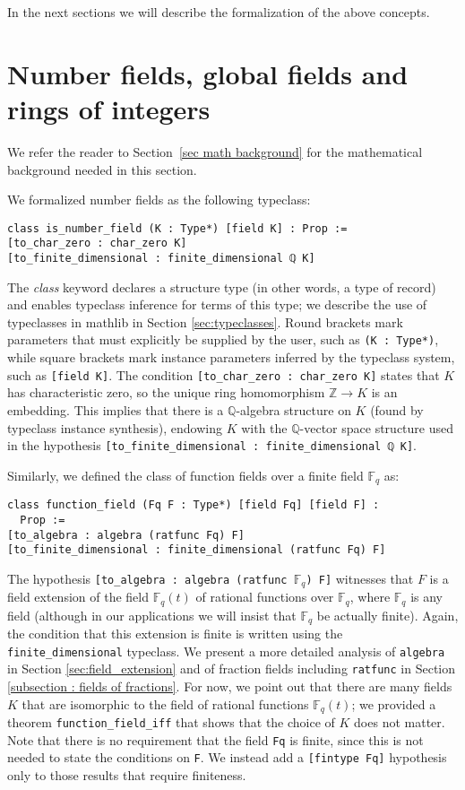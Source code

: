 \documentclass[sn-mathphys]{sn-jnl}%
\newcommand{\lean}[1]{\texttt{#1}\xspace}
\newcommand*{\Fq}[1][q]{\mathbb{F}_{#1}}
\newcommand{\mathlib}{\textsf{mathlib}\xspace}
\newcommand{\QQ}{\mathbb{Q}}
\renewcommand{\Z}{\mathbb{Z}}
\begin{document}
In the next sections we will describe the formalization of the above concepts.

\section{Number fields, global fields and rings of integers} \label{sec:number fields}

We refer the reader to Section~\ref{sec math background} for the mathematical background needed in this section.

We formalized number fields as the following typeclass:
\begin{lstlisting}
class is_number_field (K : Type*) [field K] : Prop :=
[to_char_zero : char_zero K]
[to_finite_dimensional : finite_dimensional ℚ K]
\end{lstlisting}
The \emph{class} keyword declares a structure type (in other words, a type of record) and enables typeclass inference for terms of this type;
we describe the use of typeclasses in \mathlib in Section \ref{sec:typeclasses}.
Round brackets mark parameters that must explicitly be supplied by the user, such as \lean{(K : Type*)}, while
square brackets mark instance parameters inferred by the typeclass system, such as \mbox{\lean{[field K]}}.
The condition \lean{[to\_char\_zero : char\_zero K]} states that $K$ has characteristic zero, so the unique ring homomorphism $\Z \to K$ is an embedding.
This implies that there is a $\QQ$-algebra structure on $K$ (found by typeclass instance synthesis), endowing $K$ with the $\QQ$-vector space structure used in the hypothesis \mbox{\lean{[to\_finite\_dimensional : finite\_dimensional ℚ K]}}.

Similarly, we defined the class of function fields over a finite field $\Fq$ as:
\begin{lstlisting}
class function_field (Fq F : Type*) [field Fq] [field F] :
  Prop :=
[to_algebra : algebra (ratfunc Fq) F]
[to_finite_dimensional : finite_dimensional (ratfunc Fq) F]
\end{lstlisting}
The hypothesis \lean{[to\_algebra : algebra (ratfunc $\Fq$) F]} witnesses that $F$ is a field extension of the field $\Fq[q](t)$ of rational functions over $\Fq[q]$, where $\Fq[q]$ is any field (although in our applications we will insist that $\Fq[q]$ be actually finite).
Again, the condition that this extension is finite is written using the \lean{finite\_dimensional} typeclass.
We present a more detailed analysis of \lean{algebra} in Section \ref{sec:field_extension} and of fraction fields including \lean{ratfunc} in Section \ref{subsection : fields of fractions}.
For now, we point out that there are many fields $K$ that are isomorphic to the field of rational functions $\Fq[q](t)$; we provided a theorem \lean{function\_field\_iff} that shows that the choice of $K$ does not matter.
Note that there is no requirement that the field \lean{Fq} is finite, since this is not needed to state the conditions on \lean{F}.
We instead add a \lean{[fintype Fq]} hypothesis only to those results that require finiteness.
\end{document}
